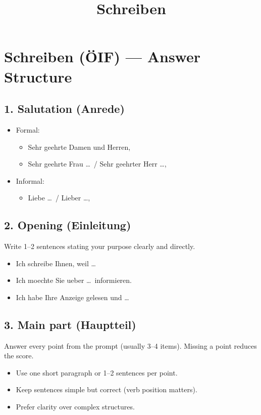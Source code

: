 \documentclass[a4paper]{article}
\title{Schreiben}
\date{}
\begin{document}
    \maketitle
    
    
    \section{Schreiben (ÖIF) --- Answer Structure}
        
        \subsection{1. Salutation (Anrede)}
            \begin{itemize}
                \item Formal:
                \begin{itemize}
                    \item Sehr geehrte Damen und Herren,
                    \item Sehr geehrte Frau \dots\ / Sehr geehrter Herr \dots,
                \end{itemize}
                \item Informal:
                \begin{itemize}
                    \item Liebe \dots\ / Lieber \dots,
                \end{itemize}
            \end{itemize}
        
        \subsection{2. Opening (Einleitung)}
            Write 1--2 sentences stating your purpose clearly and directly.
            \begin{itemize}
                \item Ich schreibe Ihnen, weil \dots
                \item Ich moechte Sie ueber \dots\ informieren.
                \item Ich habe Ihre Anzeige gelesen und \dots
            \end{itemize}
        
        \subsection{3. Main part (Hauptteil)}
            Answer every point from the prompt (usually 3--4 items). Missing a point reduces the score.
            \begin{itemize}
                \item Use one short paragraph or 1--2 sentences per point.
                \item Keep sentences simple but correct (verb position matters).
                \item Prefer clarity over complex structures.
            \end{itemize}
        
\end{document}
